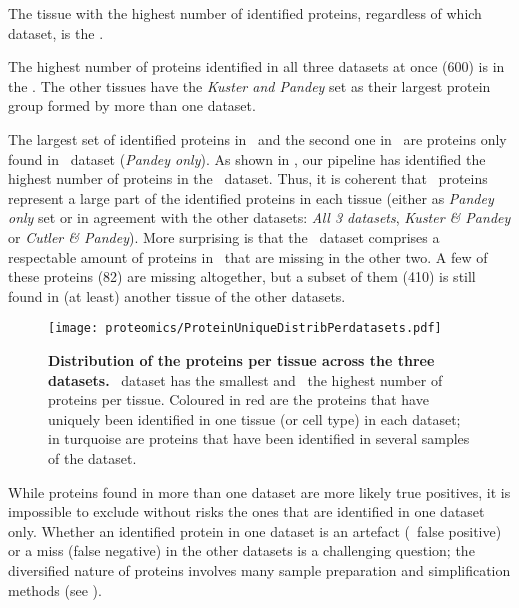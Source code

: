 The tissue with the highest number of identified proteins,
regardless of which dataset,
is the \ovary.

The highest number of proteins identified in all three datasets at once (600)
is in the \heart.
The other tissues have
the \emph{Kuster and Pandey} set as
their largest protein group formed by more than one dataset.

The largest set of identified proteins in \pancreas\
and the second one in \ovary\ are proteins only found in \pandey\ dataset
(\emph{Pandey only}).
As shown in ,
our pipeline has identified the highest number of proteins in the \pandey\ dataset.
Thus, it is coherent that \pandey\ proteins represent a large part of
the identified proteins in each tissue (either as \emph{Pandey only} set or
in agreement with the other datasets:
\emph{All 3 datasets}, \emph{Kuster \& Pandey} or \emph{Cutler \& Pandey}).
More surprising is that the \cutler\ dataset comprises a respectable amount of
proteins in \lung\ that are missing in the other two.
A few of these proteins (82) are missing altogether,
but a subset of them (410) is still found
in (at least) another tissue of the other datasets.

\begin{figure}[!htpb]
    \texttt{[image: proteomics/ProteinUniqueDistribPerdatasets.pdf]}\centering
    \caption[Distribution of the proteins per tissue]{\label{fig:distribProtUniq3D}%
    \textbf{Distribution of the proteins per tissue across the three datasets.}
    \cutler\ dataset has the smallest and \pandey\ the highest number of proteins
    per tissue.
    Coloured in red are the proteins that have uniquely been identified
    in one tissue (or cell type) in each dataset;
    in turquoise are proteins that have been identified in several samples
    of the dataset.}
\end{figure}

While proteins found in more than one dataset are more likely true positives,
it is impossible to exclude without risks the ones
that are identified in one dataset only.
Whether an identified protein in one dataset is
an artefact (\ie\ false positive) or a miss (false negative) in the other datasets
is a challenging question;
the diversified nature of proteins involves
many sample preparation and simplification methods
(see ).




